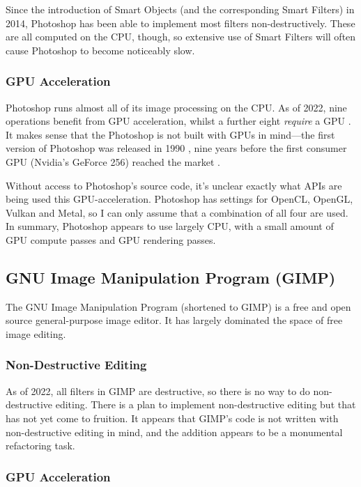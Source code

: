 \documentclass[12pt]{article}
\begin{document}
Since the introduction of Smart Objects \cite{smart-obj} (and the corresponding Smart Filters) in
2014, Photoshop has been able to implement most filters non-destructively.  These are all computed
on the CPU, though, so extensive use of Smart Filters will often cause Photoshop to become
noticeably slow.

\subsubsection{GPU Acceleration}

Photoshop runs almost all of its image processing on the CPU.  As of 2022, nine operations benefit
from GPU acceleration, whilst a further eight \emph{require} a GPU \cite{photoshop-gpu}.  It makes
sense that the Photoshop is not built with GPUs in mind---the first version of Photoshop was
released in 1990 \cite{photoshop-wiki}, nine years before the first consumer GPU (Nvidia's GeForce
256) reached the market \cite{first-gpu}.

Without access to Photoshop's source code, it's unclear exactly what APIs are being used this
GPU-acceleration.  Photoshop has settings for OpenCL, OpenGL, Vulkan and Metal, so I can only assume
that a combination of all four are used.  In summary, Photoshop appears to use largely CPU, with a
small amount of GPU compute passes and GPU rendering passes.

\subsection{GNU Image Manipulation Program (GIMP)}

The GNU Image Manipulation Program \cite{gimp} (shortened to GIMP) is a free and open
source general-purpose image editor.  It has largely dominated the space of free image editing.

\subsubsection{Non-Destructive Editing}

As of 2022, all filters in GIMP are destructive, so there is no way to do non-destructive editing.
There is a plan to implement non-destructive editing \cite{gimp-faq} but that has not yet come to
fruition.  It appears that GIMP's code is not written with non-destructive editing in mind, and the
addition appears to be a monumental refactoring task.  

\subsubsection{GPU Acceleration}
\end{document}
